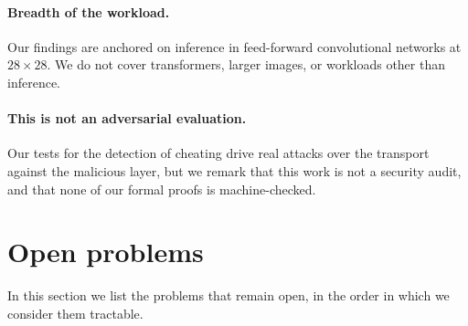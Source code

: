 \documentclass[11pt]{article}
\begin{document}
\paragraph{Breadth of the workload.} Our findings are anchored on inference in feed-forward
convolutional networks at $28\times28$. We do not cover transformers, larger images, or workloads
other than inference.

\paragraph{This is not an adversarial evaluation.} Our tests for the detection of cheating
drive real attacks over the transport against the malicious layer, but we remark that this work is
not a security audit, and that none of our formal proofs is machine-checked.

\section{Open problems}
\label{sec:open}

In this section we list the problems that remain open, in the order in which we consider them
tractable.
\end{document}
